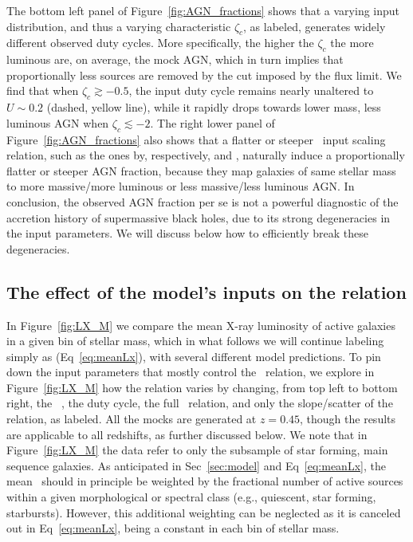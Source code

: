 The bottom left panel of Figure~\ref{fig:AGN_fractions} shows that a varying input \PLz{} distribution, and thus a varying characteristic $\zeta_c$, as labeled, generates widely different observed duty cycles. More specifically, the higher the $\zeta_c$ the more luminous are, on average, the mock AGN, which in turn implies that proportionally less sources are removed by the cut imposed by the flux limit. We find that when $\zeta_c \gtrsim -0.5$, the input duty cycle remains nearly unaltered to $U\sim 0.2$ (dashed, yellow line), while it rapidly drops towards lower mass, less luminous AGN when $\zeta_c \lesssim -2$.
The right lower panel of Figure~\ref{fig:AGN_fractions} also shows that a flatter or steeper \MBHMS\ input scaling relation, such as the ones by, respectively, \citet[][dotted, turquoise line]{2019ApJ...876..155S} and \citet[][dot-dashed, magenta line]{2018ApJ...869..113D}, naturally induce a proportionally flatter or steeper AGN fraction, because they map galaxies of same stellar mass to more massive/more luminous or less massive/less luminous AGN. In conclusion, the observed AGN fraction per se is not a powerful diagnostic of the accretion history of supermassive black holes, due to its strong degeneracies in the input parameters. We will discuss below how to efficiently break these degeneracies.


\subsection{The effect of the model's inputs on the \LXMS{} relation} \label{ssec:Fig2}

In Figure~\ref{fig:LX_M} we compare the mean X-ray luminosity of active galaxies in a given bin of stellar mass, which in what follows we will continue labeling simply as \LX{} (Eq~\ref{eq:meanLx}), with several different model predictions. To pin down the input parameters that mostly control the \LXMS\ relation, we explore in Figure~\ref{fig:LX_M} how the relation varies by changing, from top left to bottom right, the \PLz\ , the duty cycle, the full \MBHMS\ relation, and only the slope/scatter of the \citet{2015ApJ...813...82R} relation, as labeled. All the mocks are generated at $z=0.45$, though the results are applicable to all redshifts, as further discussed below. We note that in Figure~\ref{fig:LX_M} the data refer to only the subsample of star forming, main sequence galaxies. As anticipated in Sec~\ref{sec:model} and Eq~\ref{eq:meanLx}, the mean \LX\ should in principle be weighted by the fractional number of active sources within a given morphological or spectral class (e.g., quiescent, star forming, starbursts). However, this additional weighting can be neglected as it is canceled out in Eq~\ref{eq:meanLx}, being a constant in each bin of stellar mass.

